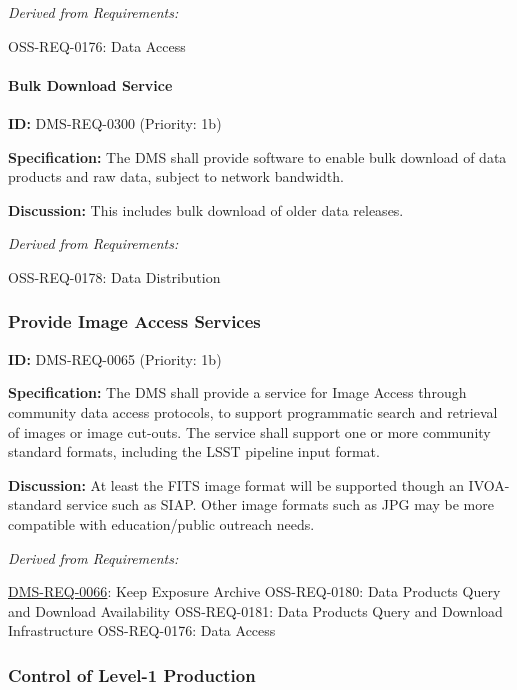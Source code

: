 \documentclass[SE,toc,lsstdraft]{lsstdoc}
\begin{document}
\emph{Derived from Requirements:}

OSS-REQ-0176:
Data Access \newline

\paragraph{Bulk Download Service}\hfill  %

\label{DMS-REQ-0300}
\textbf{ID:} DMS-REQ-0300 (Priority: 1b)

\textbf{Specification:} The DMS shall provide software to enable bulk download of data products and raw data, subject to network bandwidth.

\textbf{Discussion:} This includes bulk download of older data releases.

\emph{Derived from Requirements:}

OSS-REQ-0178:
Data Distribution \newline

\subsubsection{Provide Image Access Services}

\label{DMS-REQ-0065}
\textbf{ID:} DMS-REQ-0065 (Priority: 1b)

\textbf{Specification:} The DMS shall provide a service for Image Access through community data access protocols, to support programmatic search and retrieval of images or image cut-outs. The service shall support one or more community standard formats, including the LSST pipeline input format.

\textbf{Discussion:} At least the FITS image format will be supported though an IVOA-standard service such as SIAP. Other image formats such as JPG may be more compatible with education/public outreach needs.

\emph{Derived from Requirements:}

\hyperref[DMS-REQ-0066]{DMS-REQ-0066}:
Keep Exposure Archive \newline
OSS-REQ-0180:
Data Products Query and Download Availability \newline
OSS-REQ-0181:
Data Products Query and Download Infrastructure \newline
OSS-REQ-0176:
Data Access \newline

\subsubsection{Control of Level-1 Production}
\end{document}
